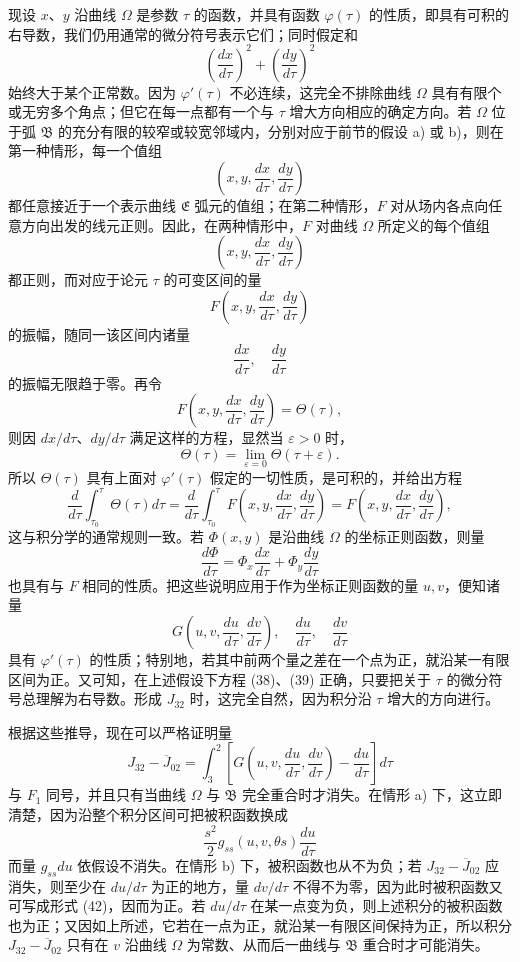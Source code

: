 \documentclass[11pt,a4paper,leqno]{article}
\begin{document}
现设 $x$、$y$ 沿曲线 $\Omega$ 是参数 $\tau$ 的函数，并具有函数 $\varphi(\tau)$ 的性质，即具有可积的右导数，我们仍用通常的微分符号表示它们；同时假定和
\[
\left(\frac{dx}{d\tau}\right)^2+
\left(\frac{dy}{d\tau}\right)^2
\]
始终大于某个正常数。因为 $\varphi'(\tau)$ 不必连续，这完全不排除曲线 $\Omega$
具有有限个或无穷多个角点；但它在每一点都有一个与 $\tau$ 增大方向相应的确定方向。若 $\Omega$ 位于弧 $\mathfrak{B}$ 的充分有限的较窄或较宽邻域内，分别对应于前节的假设 a) 或 b)，则在第一种情形，每一个值组
\[
\left(x,y,\frac{dx}{d\tau},\frac{dy}{d\tau}\right)
\]
都任意接近于一个表示曲线 $\mathfrak{E}$ 弧元的值组；在第二种情形，$F$ 对从场内各点向任意方向出发的线元正则。因此，在两种情形中，$F$ 对曲线 $\Omega$ 所定义的每个值组
\[
\left(x,y,\frac{dx}{d\tau},\frac{dy}{d\tau}\right)
\]
都正则，而对应于论元 $\tau$ 的可变区间的量
\[
F\left(x,y,\frac{dx}{d\tau},\frac{dy}{d\tau}\right)
\]
的振幅，随同一该区间内诸量
\[
\frac{dx}{d\tau},\quad \frac{dy}{d\tau}
\]
的振幅无限趋于零。再令
\[
F\left(x,y,\frac{dx}{d\tau},\frac{dy}{d\tau}\right)=\Theta(\tau),
\]
则因 $dx/d\tau$、$dy/d\tau$ 满足这样的方程，显然当 $\varepsilon>0$ 时，
\[
\Theta(\tau)=\lim_{\varepsilon=0}\Theta(\tau+\varepsilon).
\]
所以 $\Theta(\tau)$ 具有上面对 $\varphi'(\tau)$ 假定的一切性质，是可积的，并给出方程
\[
\frac{d}{d\tau}\int_{\tau_0}^{\tau}\Theta(\tau)d\tau
=\frac{d}{d\tau}\int_{\tau_0}^{\tau}F\left(x,y,\frac{dx}{d\tau},\frac{dy}{d\tau}\right)
=F\left(x,y,\frac{dx}{d\tau},\frac{dy}{d\tau}\right),
\]
这与积分学的通常规则一致。若 $\Phi(x,y)$ 是沿曲线 $\Omega$ 的坐标正则函数，则量
\[
\frac{d\Phi}{d\tau}=\Phi_x\frac{dx}{d\tau}+\Phi_y\frac{dy}{d\tau}
\]
也具有与 $F$ 相同的性质。把这些说明应用于作为坐标正则函数的量 $u,v$，便知诸量
\[
G\left(u,v,\frac{du}{d\tau},\frac{dv}{d\tau}\right),
\quad \frac{du}{d\tau},\quad \frac{dv}{d\tau}
\]
具有 $\varphi'(\tau)$ 的性质；特别地，若其中前两个量之差在一个点为正，就沿某一有限区间为正。又可知，在上述假设下方程 (38)、(39) 正确，只要把关于 $\tau$ 的微分符号总理解为右导数。形成 $J_{32}$ 时，这完全自然，因为积分沿 $\tau$ 增大的方向进行。

根据这些推导，现在可以严格证明量
\[
J_{32}-\overline{J}_{02}
=\int_3^2\left[G\left(u,v,\frac{du}{d\tau},\frac{dv}{d\tau}\right)-\frac{du}{d\tau}\right]d\tau
\]
与 $F_1$ 同号，并且只有当曲线 $\Omega$ 与 $\mathfrak{B}$ 完全重合时才消失。在情形 a) 下，这立即清楚，因为沿整个积分区间可把被积函数换成
\begin{equation}\tag{42}
\frac{s^2}{2}g_{ss}(u,v,\theta s)\frac{du}{d\tau}
\end{equation}
而量 $g_{ss}du$ 依假设不消失。在情形 b) 下，被积函数也从不为负；若 $J_{32}-\overline{J}_{02}$ 应消失，则至少在 $du/d\tau$ 为正的地方，量 $dv/d\tau$ 不得不为零，因为此时被积函数又可写成形式 (42)，因而为正。若 $du/d\tau$ 在某一点变为负，则上述积分的被积函数也为正；又因如上所述，它若在一点为正，就沿某一有限区间保持为正，所以积分 $J_{32}-\overline{J}_{02}$ 只有在 $v$ 沿曲线 $\Omega$ 为常数、从而后一曲线与 $\mathfrak{B}$ 重合时才可能消失。
\end{document}
